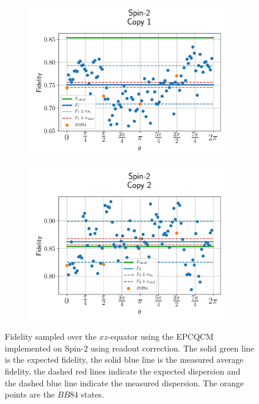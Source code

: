 \begin{figure}[H]
  \centering
  \begin{subfigure}{.5\textwidth}
    \centering
    \includegraphics[width=\textwidth]{Figures/Economical/Spin2/OnlyEquator/results_spin2_corrected_copy1.png}
    \label{fig:epc_corrected_spin2_equator_1}
  \end{subfigure}%
  \begin{subfigure}{.5\textwidth}
    \centering
    \includegraphics[width=\textwidth]{Figures/Economical/Spin2/OnlyEquator/results_spin2_corrected_copy2.png}
    \label{fig:epc_corrected_spin2_equator_2}
  \end{subfigure}
  \vspace{-0.5cm}
  \caption{Fidelity sampled over the $xz$-equator using the EPCQCM implemented on Spin-2 using readout correction.
  The solid green line is the expected fidelity, the solid blue line is the measured average fidelity, the dashed red lines indicate the expected dispersion and the dashed blue line indicate the measured dispersion. The orange points are the $BB84$ states.}
  \label{fig:epc_corrected_spin2_equator}
\end{figure}


